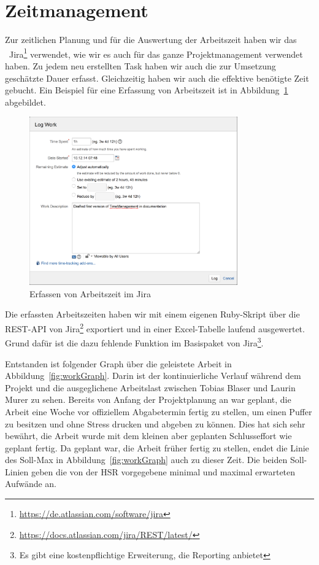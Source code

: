 \chapter*{Zeitmanagement}
	Zur zeitlichen Planung und für die Auswertung der Arbeitszeit haben wir das \ppt\ Jira\footnote{\url{https://de.atlassian.com/software/jira}} verwendet,
	wie wir es auch für das ganze Projektmanagement verwendet haben.
	Zu jedem neu erstellten Task haben wir auch die zur Umsetzung geschätzte Dauer erfasst.
	Gleichzeitig haben wir auch die effektive benötigte Zeit gebucht.
	Ein Beispiel für eine Erfassung von Arbeitszeit ist in Abbildung~\ref{fig:logWork} abgebildet.
	
	\begin{figure}[H]
		\includegraphics[width=0.8\textwidth]{projectPlan/media/img/logWork.png}
		\centering
		\caption{Erfassen von Arbeitszeit im Jira}
		\label{fig:logWork}
	\end{figure}
	
	Die erfassten Arbeitszeiten haben wir mit einem eigenen Ruby-Skript über die REST-API von Jira\footnote{\url{https://docs.atlassian.com/jira/REST/latest/}} exportiert
	und in einer Excel-Tabelle laufend ausgewertet.
	Grund dafür ist die dazu fehlende Funktion im Basispaket von Jira\footnote{Es gibt eine kostenpflichtige Erweiterung, die Reporting anbietet}.
	
	Entstanden ist folgender Graph über die geleistete Arbeit in Abbildung~\ref{fig:workGraph}.
	Darin ist der kontinuierliche Verlauf während dem Projekt
	und die ausgeglichene Arbeitslast zwischen Tobias Blaser und Laurin Murer zu sehen.
	Bereits von Anfang der Projektplanung an war geplant, die Arbeit eine Woche vor offiziellem Abgabetermin fertig zu stellen, um einen Puffer zu besitzen und ohne Stress drucken und abgeben zu können.
	Dies hat sich sehr bewährt, die Arbeit wurde mit dem kleinen aber geplanten Schlusseffort wie geplant fertig.
	Da geplant war, die Arbeit früher fertig zu stellen, endet die Linie des Soll-Max in Abbildung~\ref{fig:workGraph} auch zu dieser Zeit.
	Die beiden Soll-Linien geben die von der HSR vorgegebene minimal und maximal erwarteten Aufwände an.
	
